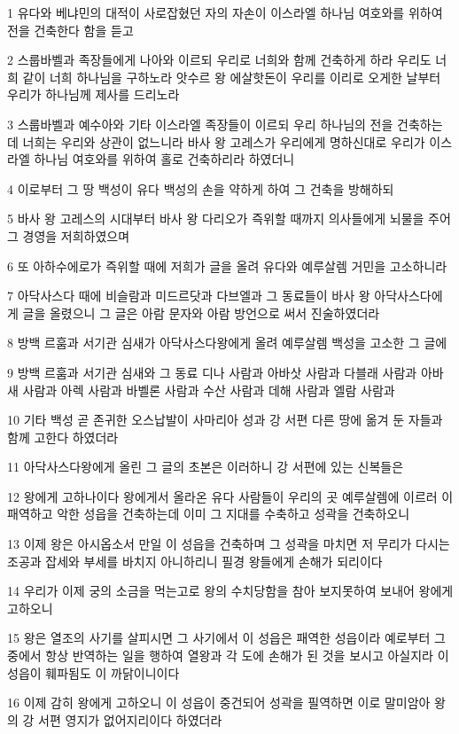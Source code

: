 \par 1 유다와 베냐민의 대적이 사로잡혔던 자의 자손이 이스라엘 하나님 여호와를 위하여 전을 건축한다 함을 듣고
\par 2 스룹바벨과 족장들에게 나아와 이르되 우리로 너희와 함께 건축하게 하라 우리도 너희 같이 너희 하나님을 구하노라 앗수르 왕 에살핫돈이 우리를 이리로 오게한 날부터 우리가 하나님께 제사를 드리노라
\par 3 스룹바벨과 예수아와 기타 이스라엘 족장들이 이르되 우리 하나님의 전을 건축하는데 너희는 우리와 상관이 없느니라 바사 왕 고레스가 우리에게 명하신대로 우리가 이스라엘 하나님 여호와를 위하여 홀로 건축하리라 하였더니
\par 4 이로부터 그 땅 백성이 유다 백성의 손을 약하게 하여 그 건축을 방해하되
\par 5 바사 왕 고레스의 시대부터 바사 왕 다리오가 즉위할 때까지 의사들에게 뇌물을 주어 그 경영을 저희하였으며
\par 6 또 아하수에로가 즉위할 때에 저희가 글을 올려 유다와 예루살렘 거민을 고소하니라
\par 7 아닥사스다 때에 비슬람과 미드르닷과 다브엘과 그 동료들이 바사 왕 아닥사스다에게 글을 올렸으니 그 글은 아람 문자와 아람 방언으로 써서 진술하였더라
\par 8 방백 르훔과 서기관 심새가 아닥사스다왕에게 올려 예루살렘 백성을 고소한 그 글에
\par 9 방백 르훔과 서기관 심새와 그 동료 디나 사람과 아바삿 사람과 다블래 사람과 아바새 사람과 아렉 사람과 바벨론 사람과 수산 사람과 데해 사람과 엘람 사람과
\par 10 기타 백성 곧 존귀한 오스납발이 사마리아 성과 강 서편 다른 땅에 옮겨 둔 자들과 함께 고한다 하였더라
\par 11 아닥사스다왕에게 올린 그 글의 초본은 이러하니 강 서편에 있는 신복들은
\par 12 왕에게 고하나이다 왕에게서 올라온 유다 사람들이 우리의 곳 예루살렘에 이르러 이 패역하고 악한 성읍을 건축하는데 이미 그 지대를 수축하고 성곽을 건축하오니
\par 13 이제 왕은 아시옵소서 만일 이 성읍을 건축하며 그 성곽을 마치면 저 무리가 다시는 조공과 잡세와 부세를 바치지 아니하리니 필경 왕들에게 손해가 되리이다
\par 14 우리가 이제 궁의 소금을 먹는고로 왕의 수치당함을 참아 보지못하여 보내어 왕에게 고하오니
\par 15 왕은 열조의 사기를 살피시면 그 사기에서 이 성읍은 패역한 성읍이라 예로부터 그 중에서 항상 반역하는 일을 행하여 열왕과 각 도에 손해가 된 것을 보시고 아실지라 이 성읍이 훼파됨도 이 까닭이니이다
\par 16 이제 감히 왕에게 고하오니 이 성읍이 중건되어 성곽을 필역하면 이로 말미암아 왕의 강 서편 영지가 없어지리이다 하였더라
